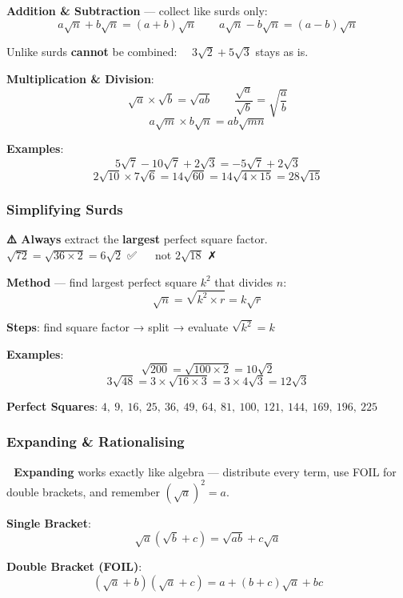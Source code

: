 \documentclass[
  letterpaper,
  DIV=11,
  numbers=noendperiod]{scrreprt}
\theoremstyle{definition}
\theoremstyle{remark}
\begin{document}
\textbf{Addition \& Subtraction} --- collect like surds only:
\[a\sqrt{n} + b\sqrt{n} = (a+b)\sqrt{n} \qquad a\sqrt{n} - b\sqrt{n} = (a-b)\sqrt{n}\]

Unlike surds \textbf{cannot} be combined:
\(\quad 3\sqrt{2} + 5\sqrt{3}\) stays as is.

\textbf{Multiplication \& Division}:
\[\sqrt{a} \times \sqrt{b} = \sqrt{ab} \qquad \frac{\sqrt{a}}{\sqrt{b}} = \sqrt{\frac{a}{b}}\]
\[a\sqrt{m} \times b\sqrt{n} = ab\sqrt{mn}\]

\textbf{Examples}:
\[5\sqrt{7} - 10\sqrt{7} + 2\sqrt{3} = -5\sqrt{7} + 2\sqrt{3}\]
\[2\sqrt{10} \times 7\sqrt{6} = 14\sqrt{60} = 14\sqrt{4 \times 15} = 28\sqrt{15}\]

\subsubsection*{Simplifying Surds}\label{simplifying-surds}

\textbf{⚠️ Always} extract the \textbf{largest} perfect square factor.\\
\(\sqrt{72} = \sqrt{36 \times 2} = 6\sqrt{2}\) ✅ \(\quad\) not
\(2\sqrt{18}\) ✗

\textbf{Method} --- find largest perfect square \(k^2\) that divides
\(n\): \[\sqrt{n} = \sqrt{k^2 \times r} = k\sqrt{r}\]

\textbf{Steps}: find square factor → split → evaluate \(\sqrt{k^2} = k\)

\textbf{Examples}: \[\sqrt{200} = \sqrt{100 \times 2} = 10\sqrt{2}\]
\[3\sqrt{48} = 3 \times \sqrt{16 \times 3} = 3 \times 4\sqrt{3} = 12\sqrt{3}\]

\textbf{Perfect Squares}:
\(4,\ 9,\ 16,\ 25,\ 36,\ 49,\ 64,\ 81,\ 100,\ 121,\ 144,\ 169,\ 196,\ 225\)

\subsubsection*{Expanding \&
Rationalising}\label{expanding-rationalising}

\textbf{📝 Expanding} works exactly like algebra --- distribute every
term, use FOIL for double brackets, and remember \((\sqrt{a})^2 = a\).

\textbf{Single Bracket}:
\[\sqrt{a}(\sqrt{b} + c) = \sqrt{ab} + c\sqrt{a}\]

\textbf{Double Bracket (FOIL)}:
\[(\sqrt{a} + b)(\sqrt{a} + c) = a + (b+c)\sqrt{a} + bc\]
\end{document}
